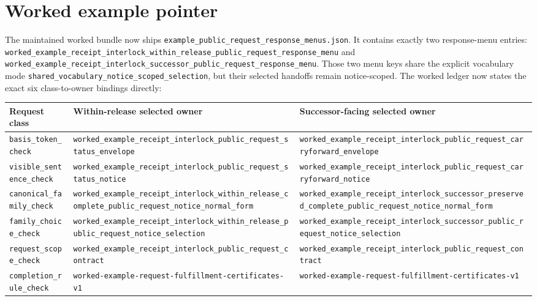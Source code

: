 \documentclass[11pt]{article}
\begin{document}
\section{Worked example pointer}
The maintained worked bundle now ships \nolinkurl{example_public_request_response_menus.json}.\cite{series:workedexample}
It contains exactly two response-menu entries:
\nolinkurl{worked_example_receipt_interlock_within_release_public_request_response_menu} and
\nolinkurl{worked_example_receipt_interlock_successor_public_request_response_menu}.
Those two menu keys share the explicit vocabulary mode
\nolinkurl{shared_vocabulary_notice_scoped_selection}, but their selected handoffs remain notice-scoped.
The worked ledger now states the exact six class-to-owner bindings directly:

\begin{center}
\small
\begin{tabularx}{\linewidth}{@{}l X X@{}}
\toprule
Request class & Within-release selected owner & Successor-facing selected owner \\
\midrule
\nolinkurl{basis_token_check} & \nolinkurl{worked_example_receipt_interlock_public_request_status_envelope} & \nolinkurl{worked_example_receipt_interlock_public_request_carryforward_envelope} \\
\nolinkurl{visible_sentence_check} & \nolinkurl{worked_example_receipt_interlock_public_request_status_notice} & \nolinkurl{worked_example_receipt_interlock_public_request_carryforward_notice} \\
\nolinkurl{canonical_family_check} & \nolinkurl{worked_example_receipt_interlock_within_release_complete_public_request_notice_normal_form} & \nolinkurl{worked_example_receipt_interlock_successor_preserved_complete_public_request_notice_normal_form} \\
\nolinkurl{family_choice_check} & \nolinkurl{worked_example_receipt_interlock_within_release_public_request_notice_selection} & \nolinkurl{worked_example_receipt_interlock_successor_public_request_notice_selection} \\
\nolinkurl{request_scope_check} & \nolinkurl{worked_example_receipt_interlock_public_request_contract} & \nolinkurl{worked_example_receipt_interlock_public_request_contract} \\
\nolinkurl{completion_rule_check} & \nolinkurl{worked-example-request-fulfillment-certificates-v1} & \nolinkurl{worked-example-request-fulfillment-certificates-v1} \\
\bottomrule
\end{tabularx}
\end{center}
\end{document}
